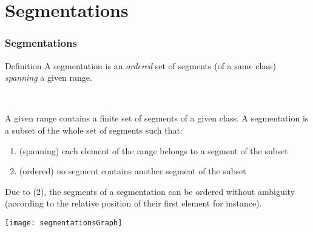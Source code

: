 
\section{Segmentations}

\begin{frame}
  \frametitle{Segmentations}
 
  \begin{block}{Definition}
A segmentation is an \emph{ordered} set of segments (of a same class) \emph{spanning} a given range. 

~

A given range contains a finite set of segments of a given class. 
A segmentation is a subset of the whole set of segments such that:
\begin{enumerate}
 \item (spanning) each element of the range belongs to a segment of the subset
 \item (ordered) no segment contains another segment of the subset 
\end{enumerate}
Due to (2), the segments of a segmentation can be ordered without ambiguity 
(according to the relative position of their first element for instance).
  \end{block}



 \begin{center}
   \texttt{[image: segmentationsGraph]}
 \end{center}

\end{frame}


